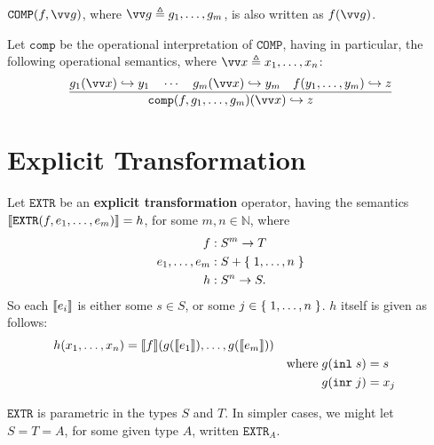 \begin{notation} $\mathtt{COMP}\p{f, \vect{g}}$, where $\vect{g} \triangleq
g_1,\ldots,g_m$, is also written as $f\p{\vect{g}}$. \end{notation}

\begin{definition} Let $\mathtt{comp}$ be the operational interpretation of
$\mathtt{COMP}$, having in particular, the following operational semantics,
where $\vect{x} \triangleq x_1, \ldots, x_n$:\begin{align*}
%
\judgement{
%
  g_1\p{\vect{x}} \goesto y_1 \quad \cdots \quad g_m\p{\vect{x}} \goesto y_m
\quad f\p{y_1,\ldots, y_m} \goesto z
%
}{
%
  \mathtt{comp}\p{f,g_1,\ldots,g_m}\p{\vect{x}} \goesto z
%
}
%
\end{align*}

\end{definition}

\section{Explicit Transformation}

\label{sec:explicit-transformation}

\begin{definition} \cite[p. 21]{smullyan-1961} Let $\mathtt{EXTR}$ be an
\textbf{explicit transformation} operator, having the semantics
${\mathopen{}\left\llbracket{\mathtt{EXTR}{\ensuremath{\mathopen{}\left({f,e_1,\ldots,e_m}\right)\mathclose{}}}}\right\rrbracket\mathclose{}} = h$, for some $m,n \in \mathbb{N}$,
where\begin{align*}
%
f & : S^m \rightarrow T \\
%
e_1, \ldots, e_m & : S + \set{1,\ldots,n} \\
%
h & : S^n \rightarrow S.
%
\end{align*} So each ${\mathopen{}\left\llbracket{e_i}\right\rrbracket\mathclose{}}$ is either some $s \in S$, or some $j \in
\mathopen{}\left\{\mathrel{}{1,\ldots, n}\mathrel{}\right\}\mathclose{}$. $h$ itself is given as follows:\begin{alignat*}{3}
%
h\p{x_1,\ldots,x_n} &= \sem{f}\p{g\p{\sem{e_1}},\ldots,g\p{\sem{e_m}}} \\
%
& & \text{where} \; g\p{\mathtt{inl} \; s} &= s \\
%
& & g\p{\mathtt{inr} \; j} &= x_j
%
\end{alignat*}

\end{definition}

\begin{remark} $\mathtt{EXTR}$ is parametric in the types $S$ and $T$. In
simpler cases, we might let $S=T=A$, for some given type $A$, written
$\mathtt{EXTR}_A$. \end{remark}

